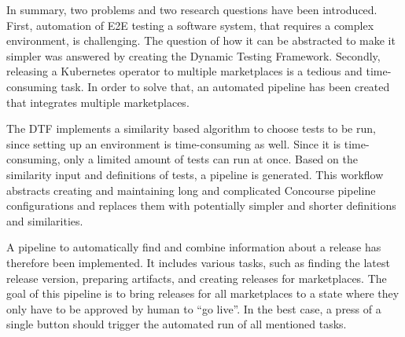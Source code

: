 In summary, two problems and two research questions have been introduced.
First, automation of E2E testing a software system, that requires a complex environment, is challenging.
The question of how it can be abstracted to make it simpler was answered by creating the Dynamic Testing Framework.
Secondly, releasing a Kubernetes operator to multiple marketplaces is a tedious and time-consuming task.
In order to solve that, an automated pipeline has been created that integrates multiple marketplaces.

The DTF implements a similarity based algorithm to choose tests to be run, since setting up an environment is time-consuming as well.
Since it is time-consuming, only a limited amount of tests can run at once.
Based on the similarity input and definitions of tests, a pipeline is generated.
This workflow abstracts creating and maintaining long and complicated Concourse pipeline configurations and replaces them with potentially simpler and shorter definitions and similarities.

A pipeline to automatically find and combine information about a release has therefore been implemented.
It includes various tasks, such as finding the latest release version, preparing artifacts, and creating releases for marketplaces.
The goal of this pipeline is to bring releases for all marketplaces to a state where they only have to be approved by human to ``go live''.
In the best case, a press of a single button should trigger the automated run of all mentioned tasks.
